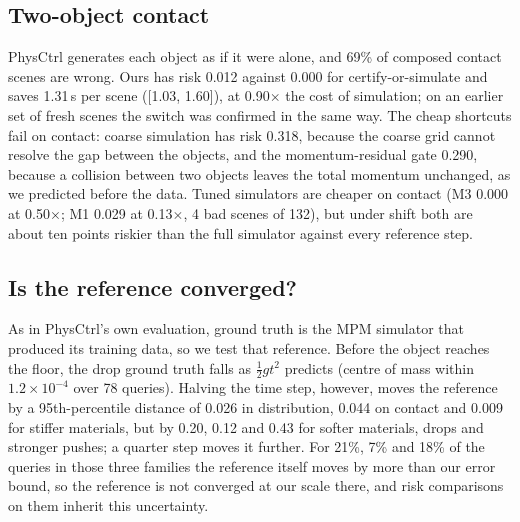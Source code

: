 \subsection{Two-object contact}
\label{sec:res-contact}
PhysCtrl generates each object as if it were alone, and 69\% of composed contact scenes are wrong.
Ours has risk 0.012 against 0.000 for certify-or-simulate and saves 1.31\,s per scene ([1.03, 1.60]), at 0.90$\times$ the cost of simulation; on an earlier set of fresh scenes the switch was confirmed in the same way.
The cheap shortcuts fail on contact: coarse simulation has risk 0.318, because the coarse grid cannot resolve the gap between the objects, and the momentum-residual gate 0.290, because a collision between two objects leaves the total momentum unchanged, as we predicted before the data.
Tuned simulators are cheaper on contact (M3 0.000 at 0.50$\times$; M1 0.029 at 0.13$\times$, 4 bad scenes of 132), but under shift both are about ten points riskier than the full simulator against every reference step.

\subsection{Is the reference converged?}
\label{sec:res-reference}
As in PhysCtrl's own evaluation, ground truth is the MPM simulator that produced its training data, so we test that reference.
Before the object reaches the floor, the drop ground truth falls as $\tfrac12 g t^2$ predicts (centre of mass within $1.2{\times}10^{-4}$ over 78 queries).
Halving the time step, however, moves the reference by a 95th-percentile distance of 0.026 in distribution, 0.044 on contact and 0.009 for stiffer materials, but by 0.20, 0.12 and 0.43 for softer materials, drops and stronger pushes; a quarter step moves it further.
For 21\%, 7\% and 18\% of the queries in those three families the reference itself moves by more than our error bound, so the reference is not converged at our scale there, and risk comparisons on them inherit this uncertainty.

\begin{table}[t]
\centering
\small
\setlength{\tabcolsep}{4.2pt}

\caption{\textbf{Every pipeline re-scored against the reference at three time steps} (Phase 9 test sets; risk = fraction with error above 0.10, each object counted once).
$\Delta t$ is PhysCtrl's step, against which \cref{tab:main} is scored; $\Delta t/4$ was pre-registered as the primary reference for this table.
\emph{Robust}: wrong against all three references (defined after the verdict).
--: not run on this set.}
\label{tab:reference}
\end{table}

